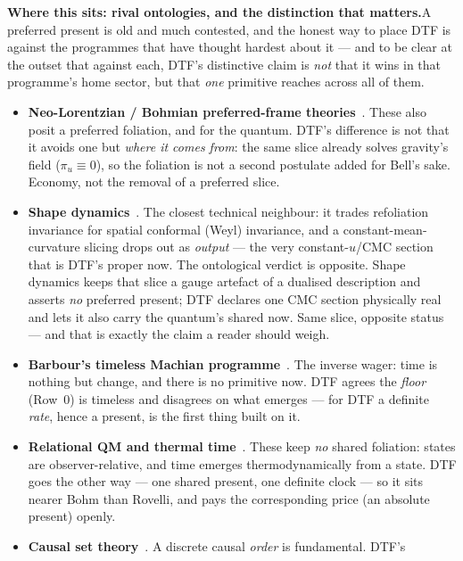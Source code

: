 \documentclass[11pt]{article}
\begin{document}
\begin{tcolorbox}
\textbf{Where this sits: rival ontologies, and the distinction that matters.}\enspace A preferred present
is old and much contested, and the honest way to place DTF is against the programmes that have thought
hardest about it --- and to be clear at the outset that against each, DTF's distinctive claim is \emph{not}
that it wins in that programme's home sector, but that \emph{one} primitive reaches across all of them.
\begin{itemize}[leftmargin=1.5em,itemsep=3pt,topsep=3pt]
  \item \textbf{Neo-Lorentzian / Bohmian preferred-frame theories}~\cite{Maudlin2011,DGNSZ2014}. These also
    posit a preferred foliation, and for the quantum. DTF's difference is not that it avoids one but
    \emph{where it comes from}: the same slice already solves gravity's field ($\pi_u\equiv0$), so the
    foliation is not a second postulate added for Bell's sake. Economy, not the removal of a preferred slice.
  \item \textbf{Shape dynamics}~\cite{GomesGrybKoslowski2011}. The closest technical neighbour: it trades
    refoliation invariance for spatial conformal (Weyl) invariance, and a constant-mean-curvature slicing
    drops out as \emph{output} --- the very constant-$u$/CMC section that is DTF's proper now. The
    ontological verdict is opposite. Shape dynamics keeps that slice a gauge artefact of a dualised
    description and asserts \emph{no} preferred present; DTF declares one CMC section physically real and
    lets it also carry the quantum's shared now. Same slice, opposite status --- and that is exactly the
    claim a reader should weigh.
  \item \textbf{Barbour's timeless Machian programme}~\cite{Barbour1999}. The inverse wager: time is
    nothing but change, and there is no primitive now. DTF agrees the \emph{floor} (Row~0) is timeless and
    disagrees on what emerges --- for DTF a definite \emph{rate}, hence a present, is the first thing built
    on it.
  \item \textbf{Relational QM and thermal time}~\cite{Rovelli1996,ConnesRovelli1994}. These keep \emph{no}
    shared foliation: states are observer-relative, and time emerges thermodynamically from a state. DTF
    goes the other way --- one shared present, one definite clock --- so it sits nearer Bohm than Rovelli,
    and pays the corresponding price (an absolute present) openly.
  \item \textbf{Causal set theory}~\cite{Bombelli1987}. A discrete causal \emph{order} is fundamental. DTF's

\end{itemize}
\end{tcolorbox}
\end{document}
